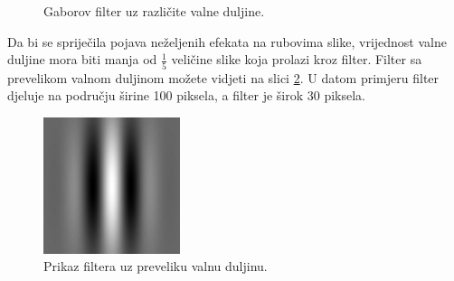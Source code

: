 \documentclass{article}
\begin{document}
\begin{figure}[htb]
  \centering
  \hspace{50pt}
  \caption{Gaborov filter uz različite valne duljine.}
  \label{fig:filter-wavelengths}
\end{figure}

Da bi se spriječila pojava neželjenih efekata na rubovima slike, vrijednost valne
duljine mora biti manja od $\frac{1}{5}$ veličine slike koja prolazi kroz
filter. Filter sa prevelikom valnom duljinom možete vidjeti na slici
\ref{fig:wavelength-overflow}. U datom primjeru filter djeluje na području
širine 100 piksela, a filter je širok 30 piksela.

\begin{figure}[htb]
\begin{center}
\includegraphics[width=4cm]{images/wavelength30overflow.jpg}
\end{center}
\caption{Prikaz filtera uz preveliku valnu duljinu.}
\label{fig:wavelength-overflow}
\end{figure}
\end{document}
